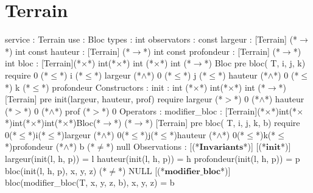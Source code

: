 \documentclass[a4paper, 11pt]{report}
\newcommand{\specB}[1]{\textbf{#1}}
\begin{document}
\section{Terrain}
\begin{Spe}
service : Terrain
use : Bloc
types : int
observators :
       const largeur : [Terrain] (*$\rightarrow$*) int
       const hauteur : [Terrain] (*$\rightarrow$*) int
       const profondeur : [Terrain] (*$\rightarrow$*) int
       bloc : [Terrain](*$\times$*) int(*$\times$*) int (*$\times$*) int (*$\rightarrow$*) Bloc
             pre bloc( T, i, j, k) require 0 (*$\leq$*) i (*$\leq$*) largeur (*$\land$*) 0 (*$\leq$*) j (*$\leq$*) hauteur (*$\land$*) 0 (*$\leq$*) k (*$\leq$*) profondeur
Constructors :
      init : int (*$\times$*) int(*$\times$*) int (*$\rightarrow$*) [Terrain]
             pre init(largeur, hauteur, prof) require largeur (*$>$*) 0 (*$\land$*) hauteur (*$>$*) 0 (*$\land$*) prof (*$>$*) 0
Operators :        
      modifier_bloc : [Terrain](*$\times$*)int(*$\times$*)int(*$\times$*)int(*$\times$*)Bloc(*$\rightarrow$*) (*$\rightarrow$*) [Terrain]
             pre bloc( T, i, j, k, b) require 0(*$\leq$*)i(*$\leq$*)largeur (*$\land$*) 0(*$\leq$*)j(*$\leq$*)hauteur (*$\land$*) 0(*$\leq$*)k(*$\leq$*)profondeur (*$\land$*) b (*$\neq$*) null
Observations :
      [(*$\specB{Invariants}$*)]
      [(*$\specB{init}$*)]
            largeur(init(l, h, p)) = l
            hauteur(init(l, h, p)) = h
            profondeur(init(l, h, p)) = p
            bloc(init(l, h, p), x, y, z) (*$\neq$*) NULL
      [(*$\specB{modifier\_bloc}$*)]
            bloc(modifier_bloc(T, x, y, z, b), x, y, z) = b 
\end{Spe}
\end{document}
